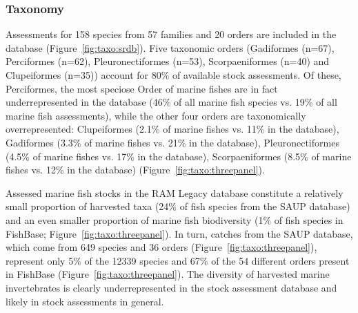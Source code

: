 
\subsubsection*{Taxonomy}

Assessments for 158 species from
57 families and 20
orders are included in the database (Figure~\ref{fig:taxo:srdb}). Five
taxonomic orders (Gadiformes (n=67),
Perciformes (n=62), Pleuronectiformes (n=53),
Scorpaeniformes (n=40) and Clupeiformes (n=35)) account for
80\% of available stock assessments.  Of these, Perciformes, the most
speciose Order of marine fishes are in fact underrepresented in the
database (46\% of all marine fish species vs.  19\% of all marine
fish assessments), while the other four orders are
taxonomically overrepresented: Clupeiformes (2.1\% of marine fishes
vs.  11\% in the database), Gadiformes (3.3\% of marine fishes vs.
21\% in the database), Pleuronectiformes (4.5\% of marine fishes vs.
17\% in the database), Scorpaeniformes (8.5\% of marine fishes vs.
12\% in the database) (Figure~\ref{fig:taxo:threepanel}).

Assessed marine fish stocks in the RAM Legacy database constitute a
relatively small proportion of harvested taxa
(24\% of fish species from the SAUP database)
and an even smaller proportion of marine fish biodiversity
(1\% of fish species in FishBase;
Figure~\ref{fig:taxo:threepanel}). In turn, catches from the SAUP
database, which come from 649 species and
36 orders (Figure~\ref{fig:taxo:threepanel}),
represent only 5\% of the
12339 species and 67\%
of the 54 different orders present in FishBase
(Figure~\ref{fig:taxo:threepanel}). The diversity of harvested marine
invertebrates is clearly underrepresented in the stock assessment
database and likely in stock assessments in general.




